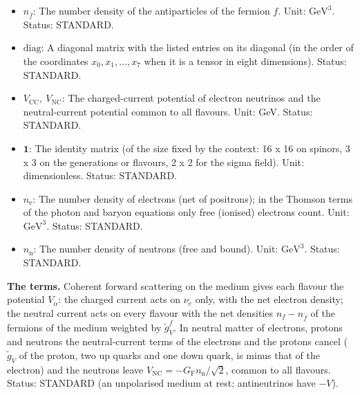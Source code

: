 \documentclass[
  10pt,
]{article}
\begin{document}
\begin{itemize}
  particle density of dirac16complex in the Kohn-Sham equations and
  \(n_o\) the contribution of the orbital \(o\), \(n_{\psi i}(y)\) the
  density of the Standard-Model fermion \(\psi_i\) (per proper 7-volume
  of eight dimensions); \(n_f\) the density of the fermion component
  \(f\) and \(n_i\) that of the neutrino mass state \(i\) (per 3-volume
  of four dimensions). Unit: \(\mathrm{GeV}^{7}\) (eight dimensions),
  \(\mathrm{GeV}^{3}\) (four dimensions). Status: STANDARD.
\item
  \(n_{\bar f}\): The number density of the antiparticles of the fermion
  \(f\). Unit: \(\mathrm{GeV}^{3}\). Status: STANDARD.
\item
  \(\mathrm{diag}\): A diagonal matrix with the listed entries on its
  diagonal (in the order of the coordinates \(x_0, x_1, \dots, x_7\)
  when it is a tensor in eight dimensions). Status: STANDARD.
\item
  \(V_{\mathrm{CC}},\ V_{\mathrm{NC}}\): The charged-current potential
  of electron neutrinos and the neutral-current potential common to all
  flavours. Unit: GeV. Status: STANDARD.
\item
  \(\mathbf{1}\): The identity matrix (of the size fixed by the context:
  16 x 16 on spinors, 3 x 3 on the generations or flavours, 2 x 2 for
  the sigma field). Unit: dimensionless. Status: STANDARD.
\item
  \(n_{\mathrm{e}}\): The number density of electrons (net of
  positrons); in the Thomson terms of the photon and baryon equations
  only free (ionised) electrons count. Unit: \(\mathrm{GeV}^{3}\).
  Status: STANDARD.
\item
  \(n_{\mathrm{n}}\): The number density of neutrons (free and bound).
  Unit: \(\mathrm{GeV}^{3}\). Status: STANDARD.
\end{itemize}

\textbf{The terms.} Coherent forward scattering on the medium gives each
flavour the potential \(V_\alpha\): the charged current acts on
\(\nu_e\) only, with the net electron density; the neutral current acts
on every flavour with the net densities \(n_f - n_{\bar f}\) of the
fermions of the medium weighted by \(\tilde g^f_V\). In neutral matter
of electrons, protons and neutrons the neutral-current terms of the
electrons and the protons cancel (\(\tilde g_V\) of the proton, two up
quarks and one down quark, is minus that of the electron) and the
neutrons leave
\(V_{\mathrm{NC}} = -G_{\mathrm{F}}n_{\mathrm{n}}/\sqrt2\), common to
all flavours. Status: STANDARD (an unpolarised medium at rest;
antineutrinos have \(-V\)).
\end{document}
